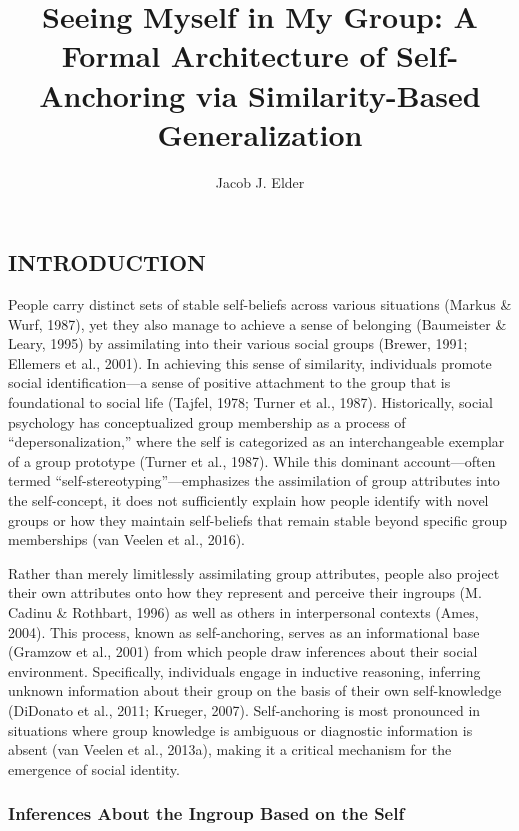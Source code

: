 \documentclass[
  man,
  longtable,
  nolmodern,
  notxfonts,
  notimes,
  man]{apa7}
\title{Seeing Myself in My Group: A Formal Architecture of
Self-Anchoring via Similarity-Based Generalization}
\author{Jacob J. Elder}
\affiliation{
{Psychology, University of California, Riverside}}
\begin{document}
\maketitle




\setlength\LTleft{0pt}




\subsection{INTRODUCTION}\label{introduction}

People carry distinct sets of stable self-beliefs across various
situations (Markus \& Wurf, 1987), yet they also manage to achieve a
sense of belonging (Baumeister \& Leary, 1995) by assimilating into
their various social groups (Brewer, 1991; Ellemers et al., 2001). In
achieving this sense of similarity, individuals promote social
identification---a sense of positive attachment to the group that is
foundational to social life (Tajfel, 1978; Turner et al., 1987).
Historically, social psychology has conceptualized group membership as a
process of ``depersonalization,'' where the self is categorized as an
interchangeable exemplar of a group prototype (Turner et al., 1987).
While this dominant account---often termed
``self-stereotyping''---emphasizes the assimilation of group attributes
into the self-concept, it does not sufficiently explain how people
identify with novel groups or how they maintain self-beliefs that remain
stable beyond specific group memberships (van Veelen et al., 2016).

Rather than merely limitlessly assimilating group attributes, people
also project their own attributes onto how they represent and perceive
their ingroups (M. Cadinu \& Rothbart, 1996) as well as others in
interpersonal contexts (Ames, 2004). This process, known as
self-anchoring, serves as an informational base (Gramzow et al., 2001)
from which people draw inferences about their social environment.
Specifically, individuals engage in inductive reasoning, inferring
unknown information about their group on the basis of their own
self-knowledge (DiDonato et al., 2011; Krueger, 2007). Self-anchoring is
most pronounced in situations where group knowledge is ambiguous or
diagnostic information is absent (van Veelen et al., 2013a), making it a
critical mechanism for the emergence of social identity.

\subsubsection{Inferences About the Ingroup Based on the
Self}\label{inferences-about-the-ingroup-based-on-the-self}
\end{document}
